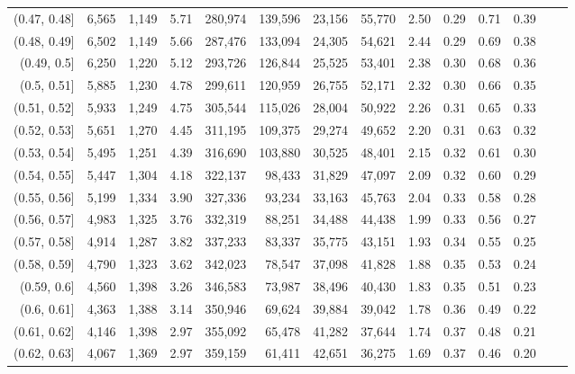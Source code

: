 \begin{tabular}{rrrrrrrrrrrrrr}
(0.47, 0.48]   &  6,565 &  1,149 &    5.71 &  280,974 &  139,596 &  23,156 &  55,770 &  2.50 &  0.29 &  0.71 &      0.39 \\
(0.48, 0.49]   &  6,502 &  1,149 &    5.66 &  287,476 &  133,094 &  24,305 &  54,621 &  2.44 &  0.29 &  0.69 &      0.38 \\
(0.49, 0.5]    &  6,250 &  1,220 &    5.12 &  293,726 &  126,844 &  25,525 &  53,401 &  2.38 &  0.30 &  0.68 &      0.36 \\
(0.5, 0.51]    &  5,885 &  1,230 &    4.78 &  299,611 &  120,959 &  26,755 &  52,171 &  2.32 &  0.30 &  0.66 &      0.35 \\
(0.51, 0.52]   &  5,933 &  1,249 &    4.75 &  305,544 &  115,026 &  28,004 &  50,922 &  2.26 &  0.31 &  0.65 &      0.33 \\
(0.52, 0.53]   &  5,651 &  1,270 &    4.45 &  311,195 &  109,375 &  29,274 &  49,652 &  2.20 &  0.31 &  0.63 &      0.32 \\
(0.53, 0.54]   &  5,495 &  1,251 &    4.39 &  316,690 &  103,880 &  30,525 &  48,401 &  2.15 &  0.32 &  0.61 &      0.30 \\
(0.54, 0.55]   &  5,447 &  1,304 &    4.18 &  322,137 &   98,433 &  31,829 &  47,097 &  2.09 &  0.32 &  0.60 &      0.29 \\
(0.55, 0.56]   &  5,199 &  1,334 &    3.90 &  327,336 &   93,234 &  33,163 &  45,763 &  2.04 &  0.33 &  0.58 &      0.28 \\
(0.56, 0.57]   &  4,983 &  1,325 &    3.76 &  332,319 &   88,251 &  34,488 &  44,438 &  1.99 &  0.33 &  0.56 &      0.27 \\
(0.57, 0.58]   &  4,914 &  1,287 &    3.82 &  337,233 &   83,337 &  35,775 &  43,151 &  1.93 &  0.34 &  0.55 &      0.25 \\
(0.58, 0.59]   &  4,790 &  1,323 &    3.62 &  342,023 &   78,547 &  37,098 &  41,828 &  1.88 &  0.35 &  0.53 &      0.24 \\
(0.59, 0.6]    &  4,560 &  1,398 &    3.26 &  346,583 &   73,987 &  38,496 &  40,430 &  1.83 &  0.35 &  0.51 &      0.23 \\
(0.6, 0.61]    &  4,363 &  1,388 &    3.14 &  350,946 &   69,624 &  39,884 &  39,042 &  1.78 &  0.36 &  0.49 &      0.22 \\
(0.61, 0.62]   &  4,146 &  1,398 &    2.97 &  355,092 &   65,478 &  41,282 &  37,644 &  1.74 &  0.37 &  0.48 &      0.21 \\
(0.62, 0.63]   &  4,067 &  1,369 &    2.97 &  359,159 &   61,411 &  42,651 &  36,275 &  1.69 &  0.37 &  0.46 &      0.20 \\

\end{tabular}
